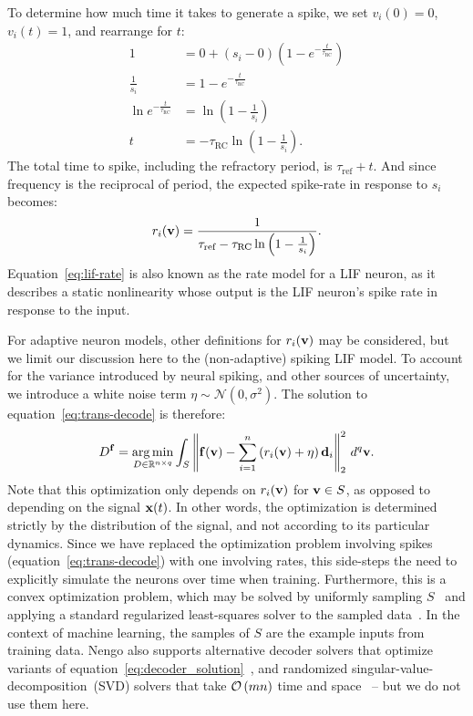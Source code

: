 To determine how much time it takes to generate a spike, we set $v_i(0) = 0$, $v_i(t) = 1$, and rearrange for $t$:
\begin{align*}
1 &= 0 + \left( s_i - 0 \right) \left(1 - e^{-\frac{t}{\tau_\text{RC}}} \right) \\
\frac{1}{s_i} &= 1 - e^{-\frac{t}{\tau_\text{RC}}} \\
\ln e^{-\frac{t}{\tau_\text{RC}}} &= \ln \left( 1 - \frac{1}{s_i} \right) \\
t &= -\tau_\text{RC} \ln \left( 1 - \frac{1}{s_i} \right) \text{.}
\end{align*}
The total time to spike, including the refractory period, is $\tau_\text{ref} + t$. And since frequency is the reciprocal of period, the expected spike-rate in response to $s_i$ becomes:
\begin{equation} \label{eq:lif-rate}
r_i(\mathbf{v}) = \frac{1}{\tau_\text{ref} -\tau_\text{RC} \ln \left( 1 - \frac{1}{s_i} \right)} \text{.}
\end{equation}
Equation~\ref{eq:lif-rate} is also known as the rate model for a LIF neuron, as it describes a static nonlinearity whose output is the LIF neuron's spike rate in response to the input.

For adaptive neuron models, other definitions for $r_i(\mathbf{v})$ may be considered, but we limit our discussion here to the (non-adaptive) spiking LIF model.
To account for the variance introduced by neural spiking, and other sources of uncertainty, we introduce a white noise term $\eta \sim \mathcal{N}(0, \sigma^2)$.
The solution to equation~\ref{eq:trans-decode} is therefore:
\begin{equation} \label{eq:decoder_solution}
D^{\mathbf{f}} = \operatorname*{arg\,min}_{D \in \mathbb{R}^{n \times q}} \int_{S} \left\| \mathbf{f}(\mathbf{v}) - \sum_{i=1}^n \left( r_i(\mathbf{v}) + \eta \right) \mathbf{d}_i \right\|_2^2 \, d^q\mathbf{v} \text{.}
\end{equation}
Note that this optimization only depends on $r_i(\mathbf{v})$ for $\mathbf{v} \in S$, as opposed to depending on the signal $\mathbf{x}(t)$.
In other words, the optimization is determined strictly by the distribution of the signal, and not according to its particular dynamics.
Since we have replaced the optimization problem involving spikes (equation~\ref{eq:trans-decode}) with one involving rates, this side-steps the need to explicitly simulate the neurons over time when training.
Furthermore, this is a convex optimization problem, which may be solved by uniformly sampling $S$~\citep{voelker2017} and applying a standard regularized least-squares solver to the sampled data~\citep{bekolay2014}.
In the context of machine learning, the samples of $S$ are the example inputs from training data.
Nengo also supports alternative decoder solvers that optimize variants of equation~\ref{eq:decoder_solution}~\citep[e.g.,][]{voelker2016a, abrams2017}, and randomized singular-value-decomposition~(SVD) solvers that take $\mathcal{O}\left({mn}\right)$ time and space~\citep{halko2011finding} -- but we do not use them here.

